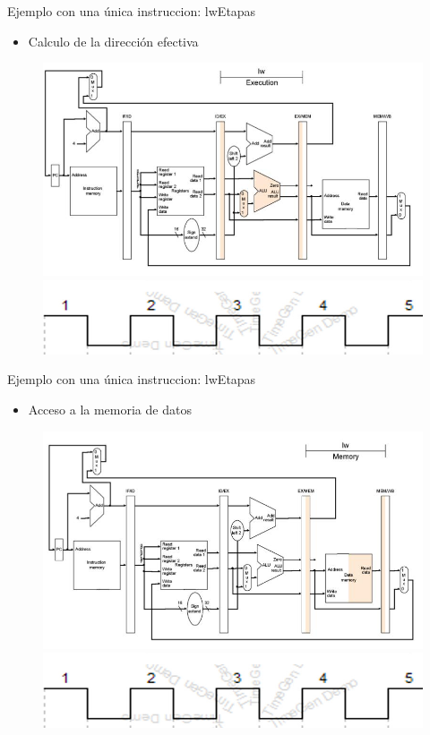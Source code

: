 \documentclass[aspectratio=169,compress]{beamer}
\begin{document}
\begin{footnotesize}
\begin{frame}{Ejemplo con una única instruccion: lw}{Etapas}
\begin{itemize}
\item Calculo de la dirección efectiva
\end{itemize}
\begin{figure}
\includegraphics[scale=0.27]{images/lw3.jpg} \\
\includegraphics[scale=0.27]{images/clock2.jpg} 
\end{figure}

\end{frame}



\begin{frame}{Ejemplo con una única instruccion: lw}{Etapas}
\begin{itemize}
\item Acceso a la memoria de datos
\end{itemize}
\begin{figure}
\includegraphics[scale=0.27]{images/lw4.jpg} \\
\includegraphics[scale=0.27]{images/clock2.jpg} 
\end{figure}


\end{frame}
\end{footnotesize}
\end{document}
